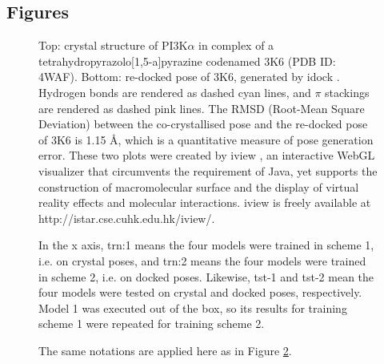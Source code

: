 \documentclass[twocolumn]{bmcart}
\begin{document}
\begin{backmatter}

\section*{Figures}

\begin{figure}[h]
\caption{ Top: crystal structure of PI3K$\alpha$ in complex of a tetrahydropyrazolo[1,5-a]pyrazine codenamed 3K6 (PDB ID: 4WAF). Bottom: re-docked pose of 3K6, generated by idock \cite{1362}. Hydrogen bonds are rendered as dashed cyan lines, and $\pi$ stackings are rendered as dashed pink lines. The RMSD (Root-Mean Square Deviation) between the co-crystallised pose and the re-docked pose of 3K6 is 1.15 \AA, which is a quantitative measure of pose generation error. These two plots were created by iview \cite{1366}, an interactive WebGL visualizer that circumvents the requirement of Java, yet supports the construction of macromolecular surface and the display of virtual reality effects and molecular interactions. iview is freely available at http://istar.cse.cuhk.edu.hk/iview/.
}
\label{fig:4WAF}
\end{figure}

\begin{figure}
\centering
\caption{ In the x axis, trn:1 means the four models were trained in scheme 1, i.e. on crystal poses, and trn:2 means the four models were trained in scheme 2, i.e. on docked poses. Likewise, tst-1 and tst-2 mean the four models were tested on crystal and docked poses, respectively. Model 1 was executed out of the box, so its results for training scheme 1 were repeated for training scheme 2.}
\label{rescoring2:set-1-pdbbind-2007-boxplot}
\end{figure}

\begin{figure}[h]
\caption{ The same notations are applied here as in Figure \ref{rescoring2:set-1-pdbbind-2007-boxplot}.}
\label{rescoring2:set-2-pdbbind-2012-boxplot}
\end{figure}


\end{backmatter}
\end{document}
